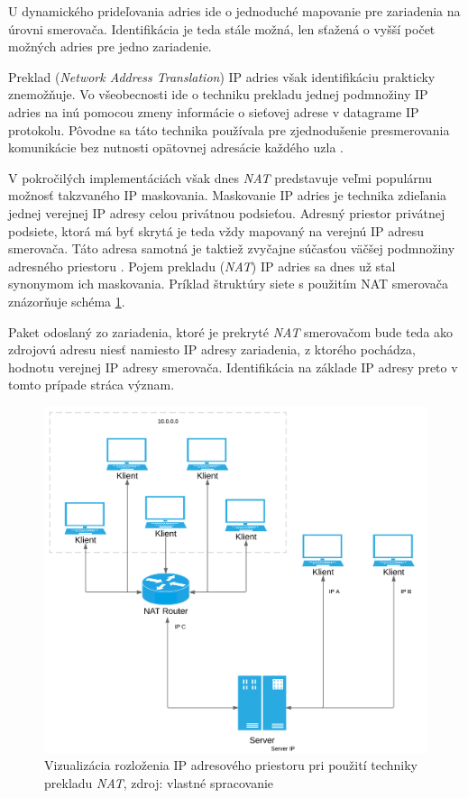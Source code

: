 \documentclass[
  printed, %
  table,   %
  lof,     %
  nolot,   %
  nocover
]{fithesis3}
\begin{document}
U dynamického prideľovania adries ide o jednoduché mapovanie pre zariadenia
na úrovni smerovača. Identifikácia je teda stále možná, len sťažená o vyšší
počet možných adries pre jedno zariadenie.

Preklad (\textit{Network Address Translation}) IP adries však identifikáciu
prakticky znemožňuje. Vo všeobecnosti ide o techniku prekladu jednej podmnožiny
IP adries na inú pomocou zmeny informácie o sieťovej adrese v datagrame IP
protokolu. Pôvodne sa táto technika používala pre zjednodušenie presmerovania
komunikácie bez nutnosti opätovnej adresácie každého uzla \cite{Huston:NAT}. 

V pokročilých
implementáciách však dnes \textit{NAT} predstavuje veľmi populárnu možnosť
takzvaného  IP maskovania. Maskovanie IP adries je technika zdieľania jednej
verejnej IP adresy celou privátnou podsieťou. Adresný priestor privátnej
podsiete, ktorá má byť skrytá je teda vždy mapovaný na verejnú IP adresu
smerovača. Táto adresa samotná je taktiež zvyčajne súčasťou väčšej podmnožiny
adresného priestoru \cite{Huston:NAT}. Pojem prekladu (\textit{NAT}) IP adries sa dnes už stal
synonymom ich maskovania. Príklad štruktúry siete s použitím NAT smerovača znázorňuje
schéma \ref{fig:tech-IP-NAT}.

Paket odoslaný zo zariadenia, ktoré je prekryté
\textit{NAT} smerovačom bude teda ako zdrojovú adresu niesť namiesto IP adresy
zariadenia, z ktorého pochádza, hodnotu verejnej IP adresy smerovača.
Identifikácia na základe IP adresy preto v tomto prípade stráca význam.

\begin{figure}[H]
  \centering
    \includegraphics[width=.93\textwidth]{images/tech-IP-NAT.png}
  \caption{Vizualizácia rozloženia IP adresového priestoru pri použití techniky
  prekladu \textit{NAT}, zdroj: vlastné spracovanie}
  \label{fig:tech-IP-NAT}
\end{figure}
\end{document}
